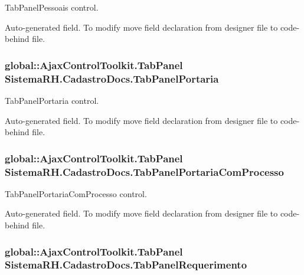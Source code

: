 TabPanelPessoais control. 

Auto-\/generated field. To modify move field declaration from designer file to code-\/behind file. \hypertarget{class_sistema_r_h_1_1_cadastro_docs_a0a4d4ac63fe4a8b43af5c125e94025a7}{
\subsubsection[{TabPanelPortaria}]{\setlength{\rightskip}{0pt plus 5cm}global::AjaxControlToolkit.TabPanel {\bf SistemaRH.CadastroDocs.TabPanelPortaria}}}
\label{class_sistema_r_h_1_1_cadastro_docs_a0a4d4ac63fe4a8b43af5c125e94025a7}


TabPanelPortaria control. 

Auto-\/generated field. To modify move field declaration from designer file to code-\/behind file. \hypertarget{class_sistema_r_h_1_1_cadastro_docs_acb79f98f49970fb8051bd947de410ef4}{
\subsubsection[{TabPanelPortariaComProcesso}]{\setlength{\rightskip}{0pt plus 5cm}global::AjaxControlToolkit.TabPanel {\bf SistemaRH.CadastroDocs.TabPanelPortariaComProcesso}}}
\label{class_sistema_r_h_1_1_cadastro_docs_acb79f98f49970fb8051bd947de410ef4}


TabPanelPortariaComProcesso control. 

Auto-\/generated field. To modify move field declaration from designer file to code-\/behind file. \hypertarget{class_sistema_r_h_1_1_cadastro_docs_a66cbe25e89418a2dcd41996092b51088}{
\subsubsection[{TabPanelRequerimento}]{\setlength{\rightskip}{0pt plus 5cm}global::AjaxControlToolkit.TabPanel {\bf SistemaRH.CadastroDocs.TabPanelRequerimento}}}
\label{class_sistema_r_h_1_1_cadastro_docs_a66cbe25e89418a2dcd41996092b51088}


